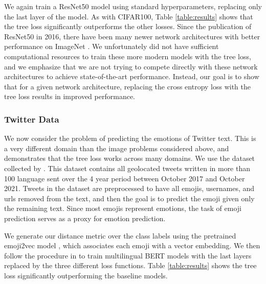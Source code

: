 \documentclass[twoside]{article}
\begin{document}
We again train a ResNet50 model \citep{He2016DeepRL} using standard hyperparameters, replacing only the last layer of the model.
As with CIFAR100, Table \ref{table:results} shows that the tree loss significantly outperforms the other losses.
Since the publication of ResNet50 in 2016,
there have been many newer network architectures with better performance on ImageNet \citep[e.g.][]{howard2017mobilenets,huang2017densely,pmlr-v97-tan19a}.
We unfortunately did not have sufficient computational resources to train these more modern models with the tree loss,
and we emphasize that we are not trying to compete directly with these network architectures to achieve state-of-the-art performance.
Instead, our goal is to show that for a given network architecture,
replacing the cross entropy loss with the tree loss results in improved performance.

\subsubsection{Twitter Data}

We now consider the problem of predicting the emotions of Twitter text.
This is a very different domain than the image problems considered above,
and demonstrates that the tree loss works across many domains.
We use the dataset collected by \citet{izbicki2019geolocating}.
This dataset contains all geolocated tweets written in more than 100 language sent over the 4 year period between October 2017 and October 2021.
Tweets in the dataset are preprocessed to have all emojis, usernames, and urls removed from the text,
and then the goal is to predict the emoji given only the remaining text.
Since most emojis represent emotions,
the task of emoji prediction serves as a proxy for emotion prediction.

We generate our distance metric over the class labels using the pretrained emoji2vec model \citep{Eisner2016emoji2vecLE},
which associates each emoji with a vector embedding.
We then follow the procedure in \citet{stoikos2020multilingual} to train multilingual BERT models \citep{Feng2020LanguageagnosticBS} with the last layers replaced by the three different loss functions.
Table \ref{table:results} shows the tree loss significantly outperforming the baseline models.
\end{document}

